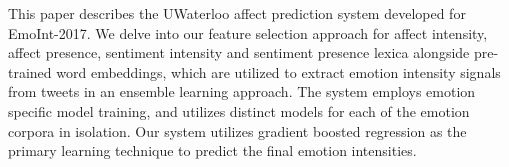 This paper describes the UWaterloo affect prediction system developed for EmoInt-2017. We delve into our feature selection approach for affect intensity, affect presence, sentiment intensity and sentiment presence lexica alongside pre-trained word embeddings, which are utilized to extract emotion intensity signals from tweets in an ensemble learning approach. The system employs emotion specific model training, and utilizes distinct models for each of the emotion corpora in isolation. Our system utilizes gradient boosted regression as the primary learning technique to predict the final emotion intensities.
